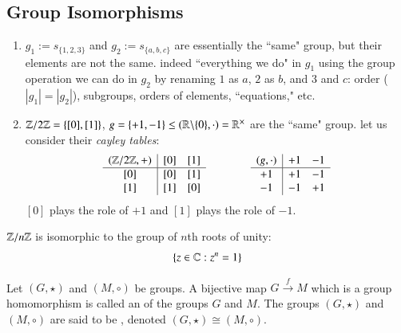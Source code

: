 \documentclass[12pt, a4paper, oneside, openright, titlepage]{book}
\begin{document}
\subsection{\textsection Group Isomorphisms}

\begin{eg}
    \leavevmode
    \begin{enumerate}
        \item $g_1 := s_{\{1,2,3\}}$ and $g_2 := s_{\{a,b,c\}}$ are essentially the ``same" group, but their elements are not the same. indeed ``everything we do" in $g_1$ using the group operation we can do in $g_2$ by renaming $1$ as $a$, $2$ as $b$, and $3$ and $c$: order ($|g_1| = |g_2|$), subgroups, orders of elements, ``equations," etc.
        \item $\mathbb Z/2\mathbb Z = \{[0],[1]\}$, $g = \{+1,-1\} \leq (\mathbb R\backslash\{0\},\cdot) = \mathbb R^{\times}$ are the ``same" group. let us consider their \emph{cayley tables}:
        \begin{equation*}
            \begin{array}{c|cc}
                (\mathbb Z/2\mathbb Z,+) & [0] & {[1]}  \\ \hline
                {[0]} & [0] & {[1]} \\
                {[1]} & [1] & {[0]} \\
            \end{array}
            \hspace{40pt}
            \begin{array}{c|cc}
                (g, \cdot) & +1 & -1  \\ \hline
                +1 & +1 & -1 \\
                -1 & -1 & +1\\
            \end{array}
        \end{equation*}
        $[0]$ plays the role of $+1$ and $[1]$ plays the role of $-1$.
    \end{enumerate} 
\end{eg}



\begin{prop}
    $\mathbb Z/n\mathbb Z$ is isomorphic to the group of $n$th roots of unity: \begin{equation}
        \{z\in\mathbb C:z^n = 1\}
    \end{equation}
\end{prop}

\begin{defn}
    Let $(G,\star)$ and $(M,\circ)$ be groups. A bijective map $G\xrightarrow{f} M$ which is a group homomorphism is called an  of the groups $G$ and $M$. The groups $(G,\star)$ and $(M,\circ)$ are said to be , denoted $(G,\star) \cong (M,\circ)$.
\end{defn}
\end{document}
